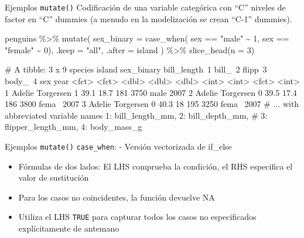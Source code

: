 \documentclass[
  ignorenonframetext,
  aspectratio=169]{beamer}
\newenvironment{Shaded}{\begin{snugshade}}{\end{snugshade}}
\newcommand{\AttributeTok}[1]{\textcolor[rgb]{0.77,0.63,0.00}{#1}}
\newcommand{\DecValTok}[1]{\textcolor[rgb]{0.00,0.00,0.81}{#1}}
\newcommand{\FunctionTok}[1]{\textcolor[rgb]{0.00,0.00,0.00}{#1}}
\newcommand{\NormalTok}[1]{#1}
\newcommand{\SpecialCharTok}[1]{\textcolor[rgb]{0.00,0.00,0.00}{#1}}
\newcommand{\StringTok}[1]{\textcolor[rgb]{0.31,0.60,0.02}{#1}}
\let\oldverbatim\verbatim
\let\endoldverbatim\endverbatim
\renewenvironment{verbatim}{\tiny\oldverbatim}{\endoldverbatim}
\begin{document}
\begin{frame}[fragile]{Ejemplos \texttt{mutate()}}
\protect\hypertarget{ejemplos-mutate-1}{}
Codificación de una variable categórica con ``C'' niveles de factor en
``C'' dummies (a menudo en la modelización se crean ``C-1'' dummies).

\begin{Shaded}
\begin{Highlighting}[]
\NormalTok{penguins }\SpecialCharTok{\%\textgreater{}\%} 
  \FunctionTok{mutate}\NormalTok{(}
    \AttributeTok{sex\_binary =} \FunctionTok{case\_when}\NormalTok{(}
\NormalTok{      sex }\SpecialCharTok{==} \StringTok{"male"} \SpecialCharTok{\textasciitilde{}} \DecValTok{1}\NormalTok{,}
\NormalTok{      sex }\SpecialCharTok{==} \StringTok{"female"} \SpecialCharTok{\textasciitilde{}} \DecValTok{0}\NormalTok{),}
    \AttributeTok{.keep =} \StringTok{"all"}\NormalTok{, }\AttributeTok{.after =}\NormalTok{ island}
\NormalTok{  ) }\SpecialCharTok{\%\textgreater{}\%} 
  \FunctionTok{slice\_head}\NormalTok{(}\AttributeTok{n =} \DecValTok{3}\NormalTok{)}
\end{Highlighting}
\end{Shaded}

\begin{verbatim}
# A tibble: 3 x 9
  species island    sex_binary bill_length~1 bill_~2 flipp~3 body_~4 sex    year
  <fct>   <fct>          <dbl>         <dbl>   <dbl>   <int>   <int> <fct> <int>
1 Adelie  Torgersen          1          39.1    18.7     181    3750 male   2007
2 Adelie  Torgersen          0          39.5    17.4     186    3800 fema~  2007
3 Adelie  Torgersen          0          40.3    18       195    3250 fema~  2007
# ... with abbreviated variable names 1: bill_length_mm, 2: bill_depth_mm,
#   3: flipper_length_mm, 4: body_mass_g
\end{verbatim}
\end{frame}

\begin{frame}[fragile]{Ejemplos \texttt{mutate()}}
\protect\hypertarget{ejemplos-mutate-2}{}
\texttt{case\_when}: - Versión vectorizada de if\_else

\begin{itemize}
\item
  Fórmulas de dos lados: El LHS comprueba la condición, el RHS
  especifica el valor de sustitución
\item
  Para los casos no coincidentes, la función devuelve NA
\item
  Utiliza el LHS \texttt{TRUE} para capturar todos los casos no
  especificados explícitamente de antemano
\end{itemize}
\end{frame}
\end{document}
